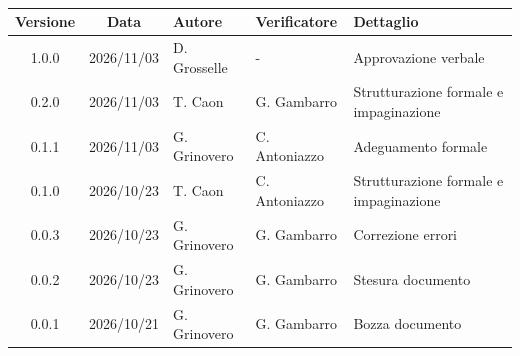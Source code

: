 \\[0.5cm]
\renewcommand{\arraystretch}{1.3}
\noindent
\begin{tabularx}{\textwidth}{|c|c|>{\raggedright\arraybackslash}p{2.5cm}|>{\raggedright\arraybackslash}p{2.5cm}|X|}
    \hline
    \textbf{Versione} & \textbf{Data} & \textbf{Autore} & \textbf{Verificatore} & \textbf{Dettaglio} \\
    \hline
    1.0.0 & 2026/11/03 & D. Grosselle & - & Approvazione verbale \\
    \hline
    0.2.0 & 2026/11/03 & T. Caon & G. Gambarro & Strutturazione formale e impaginazione \\
    \hline
    0.1.1 & 2026/11/03 & G. Grinovero & C. Antoniazzo & Adeguamento formale \\
    \hline
    0.1.0 & 2026/10/23 & T. Caon & C. Antoniazzo & Strutturazione formale e impaginazione \\
    \hline
    0.0.3 & 2026/10/23 & G. Grinovero & G. Gambarro & Correzione errori \\
    \hline
    0.0.2 & 2026/10/23 & G. Grinovero & G. Gambarro & Stesura documento \\
    \hline
    0.0.1 & 2026/10/21 & G. Grinovero & G. Gambarro & Bozza documento \\
    \hline
\end{tabularx}
\newpage
